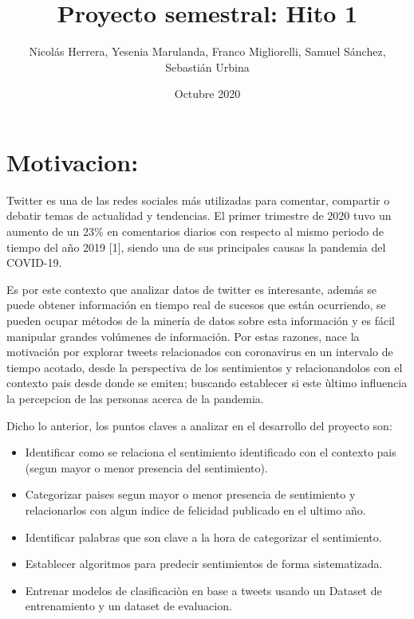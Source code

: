 \documentclass[
]{article}
\title{Proyecto semestral: Hito 1}
\author{Nicolás Herrera, Yesenia Marulanda, Franco Migliorelli, Samuel Sánchez,
Sebastián Urbina}
\date{Octubre 2020}
\providecommand{\tightlist}{%
  \setlength{\itemsep}{0pt}\setlength{\parskip}{0pt}}
\begin{document}
\maketitle

{
\setcounter{tocdepth}{2}
\tableofcontents
}
\hypertarget{motivacion}{%
\section{Motivacion:}\label{motivacion}}

Twitter es una de las redes sociales más utilizadas para comentar,
compartir o debatir temas de actualidad y tendencias. El primer
trimestre de 2020 tuvo un aumento de un 23\% en comentarios diarios con
respecto al mismo periodo de tiempo del año 2019 {[}1{]}, siendo una de
sus principales causas la pandemia del COVID-19.

Es por este contexto que analizar datos de twitter es interesante,
además se puede obtener información en tiempo real de sucesos que están
ocurriendo, se pueden ocupar métodos de la minería de datos sobre esta
información y es fácil manipular grandes volúmenes de información. Por
estas razones, nace la motivación por explorar tweets relacionados con
coronavirus en un intervalo de tiempo acotado, desde la perspectiva de
los sentimientos y relacionandolos con el contexto pais desde donde se
emiten; buscando establecer si este ùltimo influencia la percepcion de
las personas acerca de la pandemia.

Dicho lo anterior, los puntos claves a analizar en el desarrollo del
proyecto son:

\begin{itemize}
\tightlist
\item
  Identificar como se relaciona el sentimiento identificado con el
  contexto pais (segun mayor o menor presencia del sentimiento).
\item
  Categorizar paises segun mayor o menor presencia de sentimiento y
  relacionarlos con algun indice de felicidad publicado en el ultimo
  año.
\item
  Identificar palabras que son clave a la hora de categorizar el
  sentimiento.
\item
  Establecer algoritmos para predecir sentimientos de forma
  sistematizada.
\item
  Entrenar modelos de clasificaciòn en base a tweets usando un Dataset
  de entrenamiento y un dataset de evaluacion.
\end{itemize}
\end{document}
